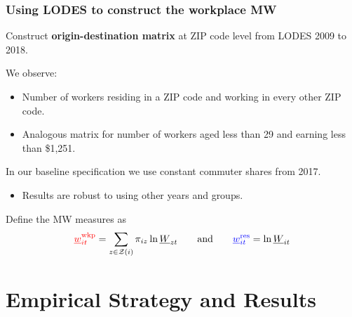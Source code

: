 \documentclass[aspectratio=169, t]{beamer}
\newcommand{\Z}{\mathcal{Z}}
\newcommand{\MW}{\underline{W}}
\newcommand{\mw}{\underline{w}}
\newcommand{\wkp}{\text{wkp}}
\newcommand{\res}{\text{res}}
\begin{document}
\begin{frame}
    \frametitle{Using LODES to construct the workplace MW}
    
    \vspace{2mm}
    
    Construct \textbf{origin-destination matrix} at ZIP code level from LODES 2009 to 2018.
    
    \vspace{2mm}

    We observe:
    \begin{itemize} \small
        \item Number of workers residing in a ZIP code and working in every other ZIP code.
        \item Analogous matrix for number of workers aged less than 29 and earning less than 
        \$1,251.
    \end{itemize}
    
    \vspace{2mm}
    In our baseline specification we use constant commuter shares from 2017.
    \begin{itemize} \small
        \item Results are robust to using other years and groups.
    \end{itemize}

    \pause
    \vspace{5mm}
    Define the MW measures as
    $$
    {\color{red} \mw^{\wkp}_{it}} = \sum_{z \in \Z(i)} \pi_{i z} \ln \MW_{zt}
    \quad\quad\text{and}\quad\quad
    {\color{blue} \mw^{\res}_{it}} = \ln \MW_{it}
    $$
\end{frame}

\section{Empirical Strategy and Results}
\end{document}
